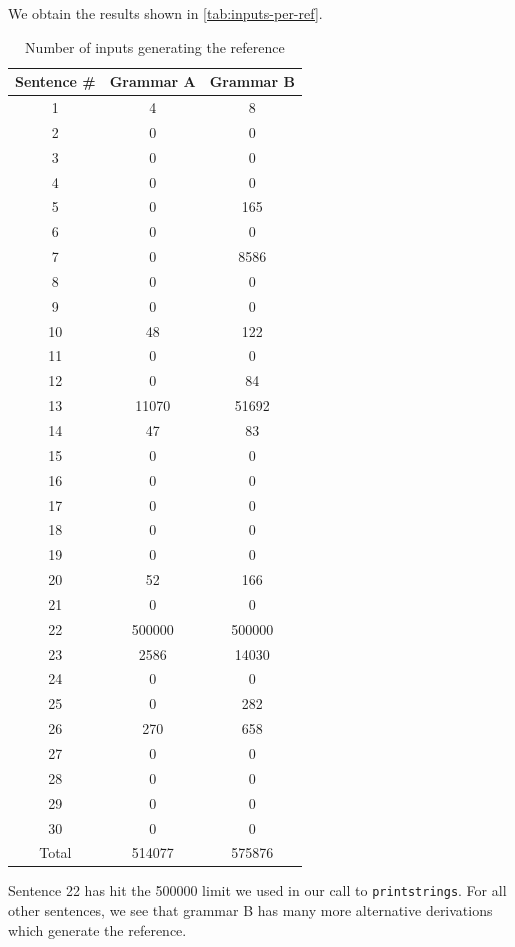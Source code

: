 \documentclass[a4paper,oneside,reqno]{amsart}
\begin{document}
\begin{enumerate}[label=\arabic*.]
    We obtain the results shown in \autoref{tab:inputs-per-ref}.
    \begin{table}[H]
      \begin{tabular}{ccc}
        \toprule
        Sentence \# & Grammar A & Grammar B \\
        \midrule
        1 & 4 & 8 \\
        2 & 0 & 0 \\
        3 & 0 & 0 \\
        4 & 0 & 0 \\
        5 & 0 & 165 \\
        6 & 0 & 0 \\
        7 & 0 & 8586 \\
        8 & 0 & 0 \\
        9 & 0 & 0 \\
        10 & 48 & 122 \\
        11 & 0 & 0 \\
        12 & 0 & 84 \\
        13 & 11070 & 51692 \\
        14 & 47 & 83 \\
        15 & 0 & 0 \\
        16 & 0 & 0 \\
        17 & 0 & 0 \\
        18 & 0 & 0 \\
        19 & 0 & 0 \\
        20 & 52 & 166 \\
        21 & 0 & 0 \\
        22 & 500000 & 500000 \\
        23 & 2586 & 14030 \\
        24 & 0 & 0 \\
        25 & 0 & 282 \\
        26 & 270 & 658 \\
        27 & 0 & 0 \\
        28 & 0 & 0 \\
        29 & 0 & 0 \\
        30 & 0 & 0 \\
        \hline
        Total & 514077 & 575876 \\
        \bottomrule
      \end{tabular}
      \caption{Number of inputs generating the reference}
      \label{tab:inputs-per-ref}
    \end{table}
    Sentence 22 has hit the 500000 limit we used in our call to
    \texttt{printstrings}.  For all other sentences, we see that grammar B has
    many more alternative derivations which generate the reference.


\end{enumerate}
\end{document}
